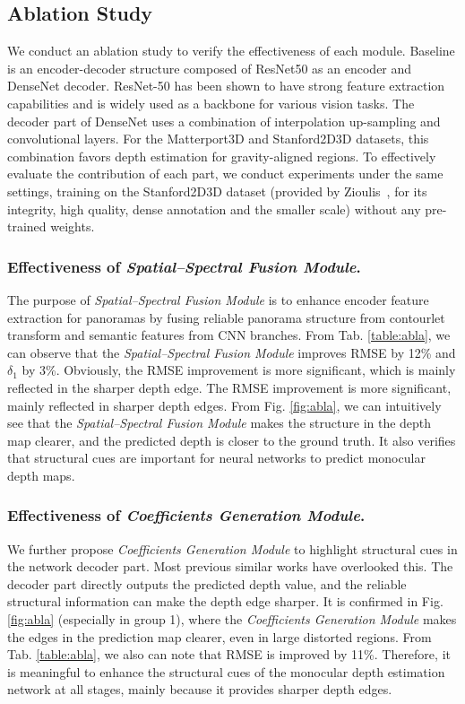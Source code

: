 \documentclass[10pt,times,mathptm,psfig,twocolumn,journals]{IEEEtran}
\begin{document}
 \subsection{Ablation Study}
 \label{abla}
 We conduct an ablation study to verify the effectiveness of each module. Baseline is an encoder-decoder structure composed of ResNet50 as an encoder and DenseNet decoder. ResNet-50 has been shown to have strong feature extraction capabilities and is widely used as a backbone for various vision tasks. The decoder part of DenseNet uses a combination of interpolation up-sampling and convolutional layers. For the Matterport3D and Stanford2D3D datasets, this combination favors depth estimation for gravity-aligned regions. To effectively evaluate the contribution of each part, we conduct experiments under the same settings, training on the Stanford2D3D dataset (provided by Zioulis~\cite{zioulis2018omnidepth}, for its integrity, high quality, dense annotation and the smaller scale) without any pre-trained weights.


\subsubsection{Effectiveness of \textit{Spatial–Spectral Fusion Module}.} The purpose of \textit{Spatial–Spectral Fusion Module} is to enhance encoder feature extraction for panoramas by fusing reliable panorama structure from contourlet transform and semantic features from CNN branches. From Tab. \ref{table:abla}, we can observe that the \textit{Spatial–Spectral Fusion Module} improves RMSE by 12\% and $\delta_{1}$ by 3\%. Obviously, the RMSE improvement is more significant, which is mainly reflected in the sharper depth edge. The RMSE improvement is more significant, mainly reflected in sharper depth edges. From Fig. \ref{fig:abla}, we can intuitively see that the \textit{Spatial–Spectral Fusion Module}  makes the structure in the depth map clearer, and the predicted depth is closer to the ground truth. It also verifies that structural cues are important for neural networks to predict monocular depth maps.
\subsubsection{Effectiveness of \textit{Coefficients Generation Module}.} We further propose \textit{Coefficients Generation Module} to highlight structural cues in the network decoder part. Most previous similar works have overlooked this. The decoder part directly outputs the predicted depth value, and the reliable structural information can make the depth edge sharper. It is confirmed in Fig. \ref{fig:abla} (especially in group 1), where the \textit{Coefficients Generation Module} makes the edges in the prediction map clearer, even in large distorted regions. From Tab. \ref{table:abla}, we also can note that RMSE is improved by 11\%. Therefore, it is meaningful to enhance the structural cues of the monocular depth estimation network at all stages, mainly because it provides sharper depth edges.
\end{document}
